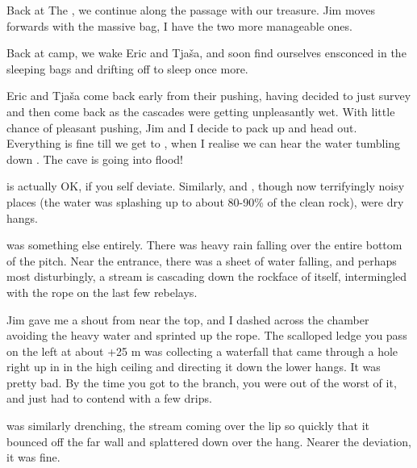 Back at The , we continue along the passage with our
treasure. Jim moves forwards with the massive bag, I have the two more
manageable ones.

Back at camp, we wake Eric and Tjaša, and soon find ourselves ensconced
in the sleeping bags and drifting off to sleep once more.

Eric and Tjaša come back early from their pushing, having decided to just survey and then come back as the  cascades were getting unpleasantly wet. With little chance of pleasant pushing, Jim and I decide to pack up and head out. Everything is fine till we get to , when I realise we can hear the water tumbling down . The cave is going into flood!

 is actually OK, if you self deviate. Similarly,  and , though now terrifyingly noisy places (the water was splashing up to about 80-90\% of the clean rock), were dry hangs.

 was something else entirely. There was heavy rain falling over the
entire bottom of the pitch. Near the  entrance, there was a sheet of
water falling, and perhaps most disturbingly, a stream is cascading down
the rockface of  itself, intermingled with the rope on the last few
rebelays.

Jim gave me a shout from near the top, and I dashed across the chamber
avoiding the heavy water and sprinted up the rope. The scalloped ledge
you pass on the left at about +25 m was collecting a waterfall that came
through a hole right up in in the high ceiling and directing it down the
lower hangs. It was pretty bad. By the time you got to the  branch, you were out of the worst of it, and just had to
contend with a few drips.

 was similarly drenching, the stream coming over the lip so
quickly that it bounced off the far wall and splattered down over the
hang. Nearer the deviation, it was fine.


